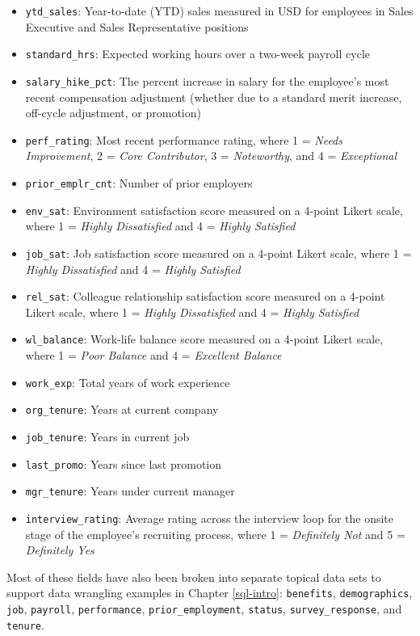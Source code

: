 \documentclass[
]{book}
\begin{document}
\begin{itemize}
\item
  \texttt{ytd\_sales}: Year-to-date (YTD) sales measured in USD for employees in Sales Executive and Sales Representative positions
\item
  \texttt{standard\_hrs}: Expected working hours over a two-week payroll cycle
\item
  \texttt{salary\_hike\_pct}: The percent increase in salary for the employee's most recent compensation adjustment (whether due to a standard merit increase, off-cycle adjustment, or promotion)
\item
  \texttt{perf\_rating}: Most recent performance rating, where 1 = \emph{Needs Improvement}, 2 = \emph{Core Contributor}, 3 = \emph{Noteworthy}, and 4 = \emph{Exceptional}
\item
  \texttt{prior\_emplr\_cnt}: Number of prior employers
\item
  \texttt{env\_sat}: Environment satisfaction score measured on a 4-point Likert scale, where 1 = \emph{Highly Dissatisfied} and 4 = \emph{Highly Satisfied}
\item
  \texttt{job\_sat}: Job satisfaction score measured on a 4-point Likert scale, where 1 = \emph{Highly Dissatisfied} and 4 = \emph{Highly Satisfied}
\item
  \texttt{rel\_sat}: Colleague relationship satisfaction score measured on a 4-point Likert scale, where 1 = \emph{Highly Dissatisfied} and 4 = \emph{Highly Satisfied}
\item
  \texttt{wl\_balance}: Work-life balance score measured on a 4-point Likert scale, where 1 = \emph{Poor Balance} and 4 = \emph{Excellent Balance}
\item
  \texttt{work\_exp}: Total years of work experience
\item
  \texttt{org\_tenure}: Years at current company
\item
  \texttt{job\_tenure}: Years in current job
\item
  \texttt{last\_promo}: Years since last promotion
\item
  \texttt{mgr\_tenure}: Years under current manager
\item
  \texttt{interview\_rating}: Average rating across the interview loop for the onsite stage of the employee's recruiting process, where 1 = \emph{Definitely Not} and 5 = \emph{Definitely Yes}
\end{itemize}

Most of these fields have also been broken into separate topical data sets to support data wrangling examples in Chapter \ref{sql-intro}: \texttt{benefits}, \texttt{demographics}, \texttt{job}, \texttt{payroll}, \texttt{performance}, \texttt{prior\_employment}, \texttt{status}, \texttt{survey\_response}, and \texttt{tenure}.
\end{document}
